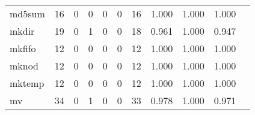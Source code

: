 \begin{longtable}{lp{1.2cm}p{1.2cm}p{1.2cm}p{1.2cm}p{1.2cm}p{1.2cm}p{1.2cm}p{1.2cm}p{1.2cm}p{1.2cm}}
md5sum    &                                    16 &                                                  0 &                                                  0 &                                                  0 &                                                  0 &                                                 16 &                                         1.000 &                                              1.000 &                                              1.000 \\
mkdir     &                                    19 &                                                  0 &                                                  1 &                                                  0 &                                                  0 &                                                 18 &                                         0.961 &                                              1.000 &                                              0.947 \\
mkfifo    &                                    12 &                                                  0 &                                                  0 &                                                  0 &                                                  0 &                                                 12 &                                         1.000 &                                              1.000 &                                              1.000 \\
mknod     &                                    12 &                                                  0 &                                                  0 &                                                  0 &                                                  0 &                                                 12 &                                         1.000 &                                              1.000 &                                              1.000 \\
mktemp    &                                    12 &                                                  0 &                                                  0 &                                                  0 &                                                  0 &                                                 12 &                                         1.000 &                                              1.000 &                                              1.000 \\
mv        &                                    34 &                                                  0 &                                                  1 &                                                  0 &                                                  0 &                                                 33 &                                         0.978 &                                              1.000 &                                              0.971 \\

\end{longtable}
